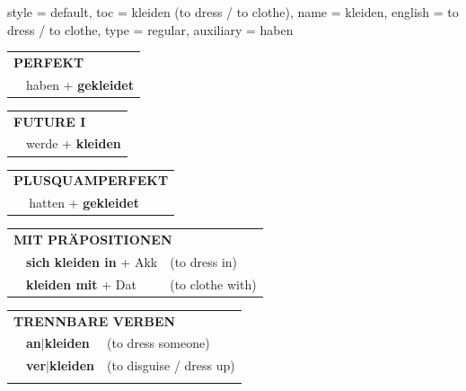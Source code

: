\begin{verbentry}{
  style = {default},
  toc = {kleiden (to dress / to clothe)},
  name = {kleiden},
  english = {to dress / to clothe},
  type = {regular},
  auxiliary = {haben}
}
 \begin{tabular}{rl}
     \multicolumn{2}{l}{\textbf{PERFEKT}}\\
   & haben + \textbf{gekleidet}\\
  \end{tabular}
\hfill
   \begin{tabular}{rl}
    \multicolumn{2}{l}{\textbf{FUTURE I} }\\
   & werde + \textbf{kleiden}\\
  \end{tabular}
\hfill
   \begin{tabular}{rl}
      \multicolumn{2}{l}{\textbf{PLUSQUAMPERFEKT}}\\
   & hatten + \textbf{gekleidet}\\
  \end{tabular}

   \vspace{10pt}

   \begin{tabular}{lll}
      \multicolumn{3}{l}{\textbf{MIT PRÄPOSITIONEN}}\\
& \textbf{sich kleiden in} + Akk & (to dress in)\\
& \textbf{kleiden mit} + Dat & (to clothe with)\\
\end{tabular}
  \hfill
   \begin{tabular}{lll}
      \multicolumn{3}{l}{\textbf{TRENNBARE VERBEN}}\\
 & \textbf{an$|$kleiden} & (to dress someone)\\
 & \textbf{ver$|$kleiden} & (to disguise / dress up)\\
\vspace{10pt}
  \end{tabular}

  \vspace{-5pt}
\end{verbentry}

